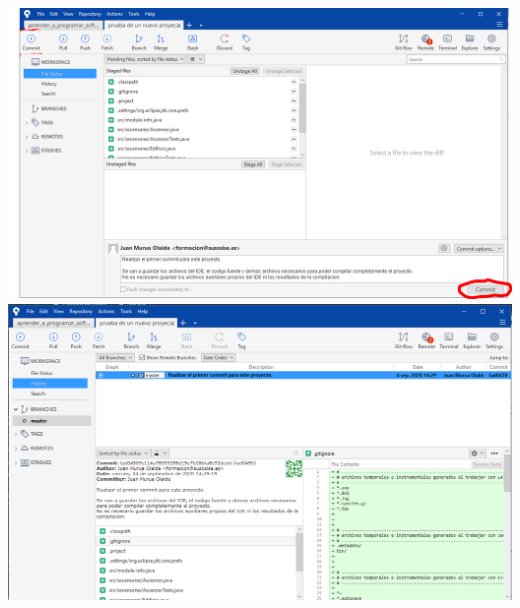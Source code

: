 \documentclass[spanish,12pt,a4paper,final,oneside]{book}
\begin{document}
\includegraphics[width=\textwidth]{Sourcetree - commit}
\includegraphics[width=\textwidth]{Sourcetree - rama master tras el primer commit}
\end{document}

